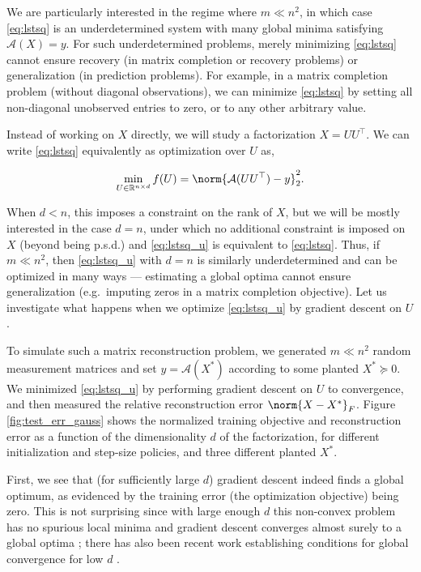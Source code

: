 We are particularly interested in the regime where $m \ll n^2$, in which case \eqref{eq:lstsq} is an underdetermined system with many global minima satisfying $\mathcal{A}(X)=y$.  For such underdetermined problems, merely minimizing \eqref{eq:lstsq} cannot ensure recovery (in matrix completion or recovery problems) or generalization (in prediction problems).  For example, in a matrix completion problem (without diagonal observations), we can minimize
\eqref{eq:lstsq} by setting all non-diagonal unobserved entries to zero, or to any other arbitrary value.

Instead of working on $X$ directly, we will study a factorization
$X=UU^\top$. We can write \eqref{eq:lstsq} equivalently as optimization over $U$ as,

\begin{equation}
\min_{U\in\mathbb{R}^{n\times d}} f(U)=\norm{\mathcal{A}(UU^\top)-y}_2^2. 
\label{eq:lstsq_u}
\end{equation}

When $d<n$, this imposes a constraint on the rank of $X$, but we will be mostly interested in the case $d=n$, under which  no additional constraint is imposed on $X$ (beyond being p.s.d.) and
\eqref{eq:lstsq_u} is equivalent to \eqref{eq:lstsq}. Thus, if $m \ll n^2$,  then \eqref{eq:lstsq_u} with $d=n$ is similarly underdetermined and can be optimized in many ways --- estimating a global optima cannot ensure generalization (e.g.~imputing zeros in a matrix completion objective). Let us investigate what happens when we optimize
\eqref{eq:lstsq_u} by gradient descent on $U$.  

To simulate such a matrix reconstruction problem, we generated $m \ll n^2$ random measurement matrices and set $y = \mathcal{A}({X^*})$ according to some planted $X^*\succeq 0$. We minimized \eqref{eq:lstsq_u} by performing gradient descent on $U$ to convergence, and then measured the relative reconstruction error $\norm{X-X^*}_F$.  Figure
\ref{fig:test_err_gauss} shows the normalized training objective and reconstruction error as a function of the dimensionality $d$ of the factorization,  for different initialization and step-size policies, and three different planted $X^*$.

First, we see that (for sufficiently large $d$) gradient descent indeed finds a global optimum, as evidenced by the training error (the optimization objective) being zero. This is not surprising since with large enough $d$ this non-convex problem has no spurious local minima \citep{burer2003nonlinear,journee2010low}  and gradient descent converges almost surely to a global optima \citep{lee2016gradient}; there has also been recent work establishing conditions for global convergence for low $d$ \citep{bhojanapalli2016global,ge2016matrix}.


